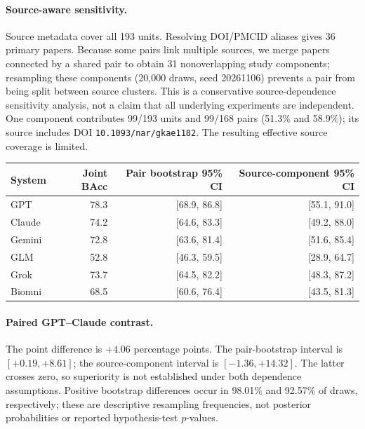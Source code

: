 \paragraph{Source-aware sensitivity.} Source metadata cover all 193 units. Resolving DOI/PMCID aliases gives 36 primary papers. Because some pairs link multiple sources, we merge papers connected by a shared pair to obtain 31 nonoverlapping study components; resampling these components (20,000 draws, seed 20261106) prevents a pair from being split between source clusters. This is a conservative source-dependence sensitivity analysis, not a claim that all underlying experiments are independent. One component contributes 99/193 units and 99/168 pairs (51.3\% and 58.9\%); its source includes DOI \texttt{10.1093/nar/gkae1182}. The resulting effective source coverage is limited.
\begin{center}
\begin{tabular}{lrrr}
\toprule
System & Joint BAcc & Pair bootstrap 95\% CI & Source-component 95\% CI \\
\midrule
GPT & 78.3 & [68.9, 86.8] & [55.1, 91.0] \\
Claude & 74.2 & [64.6, 83.3] & [49.2, 88.0] \\
Gemini & 72.8 & [63.6, 81.4] & [51.6, 85.4] \\
GLM & 52.8 & [46.3, 59.5] & [28.9, 64.7] \\
Grok & 73.7 & [64.5, 82.2] & [48.3, 87.2] \\
Biomni & 68.5 & [60.6, 76.4] & [43.5, 81.3] \\
\bottomrule
\end{tabular}
\end{center}
\paragraph{Paired GPT--Claude contrast.} The point difference is $+4.06$ percentage points. The pair-bootstrap interval is $[+0.19,+8.61]$; the source-component interval is $[-1.36,+14.32]$. The latter crosses zero, so superiority is not established under both dependence assumptions. Positive bootstrap differences occur in 98.01\% and 92.57\% of draws, respectively; these are descriptive resampling frequencies, not posterior probabilities or reported hypothesis-test $p$-values.

